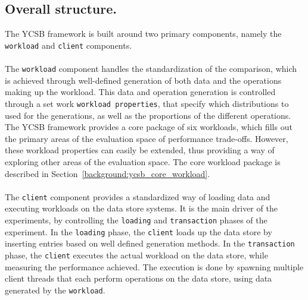 \documentclass[11pt]{report} %
\begin{document}
\subsection{Overall structure.}
The YCSB framework is built around two primary components, namely the \verb|workload| and \verb|client| components. \\
\\
The \verb|workload| component handles the standardization of the comparison, which is achieved through well-defined generation of both data and the operations making up the workload. This data and operation generation is controlled through a set work \verb|workload properties|, that specify which distributions to used for the generations, as well as the proportions of the different operations. The YCSB framework provides a core package of six workloads, which fills out the primary areas of the evaluation space of performance trade-offs. However, these workload properties can easily be extended, thus providing a way of exploring other areas of the evaluation space. The core workload package is described in Section~\ref{background:ycsb_core_workload}.\\
\\
The \verb|client| component provides a standardized way of loading data and executing workloads on the data store systems. It is the main driver of the experiments, by controlling the \verb|loading| and \verb|transaction| phases of the experiment. In the \verb|loading| phase, the \verb|client| loads up the data store by inserting entries based on well defined generation methods. In the \verb|transaction| phase, the \verb|client| executes the actual workload on the data store, while measuring the performance achieved. The execution is done by spawning multiple client threads that each perform operations on the data store, using data generated by the \verb|workload|.

\end{document}
